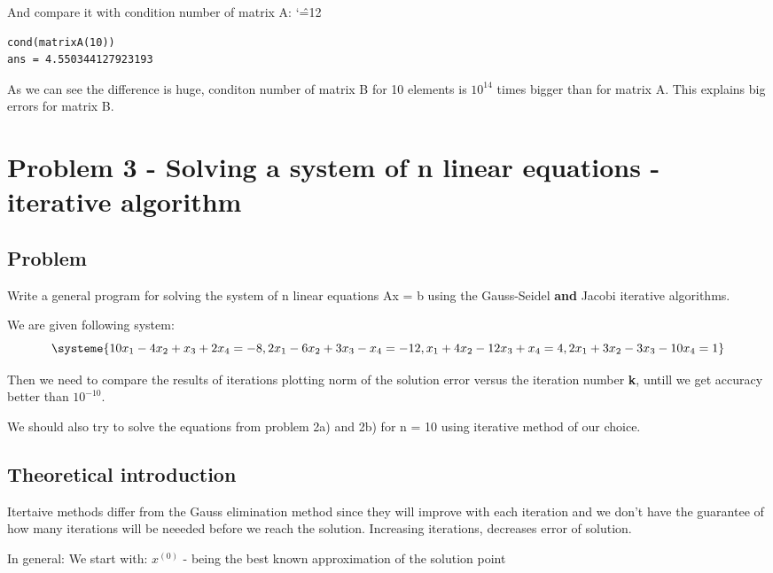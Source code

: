 \documentclass[12pt]{report}
\newenvironment{simplechar}{%
   \catcode`\^=12
}{}
\begin{document}
And compare it with condition number of matrix A:
\begin{simplechar}
\begin{lstlisting}
cond(matrixA(10))
ans = 4.550344127923193
\end{lstlisting}
\end{simplechar}
As we can see the difference is huge, conditon number of matrix B for 10 elements is $10^{14}$ times bigger than for matrix A. This explains big errors for matrix B.











\chapter{Problem 3 - Solving a system of n linear equations - iterative algorithm}

\section{Problem}
Write a general program for solving the system of n linear equations Ax = b using the Gauss-Seidel \textbf{and} Jacobi iterative algorithms.

We are given following system:
\[
\systeme{10x_1-4x_2+x_3+2x_4=-8, 2x_1-6x_2+3x_3-x_4=-12, x_1+4x_2-12x_3+x_4=4, 2x_1+3x_2-3x_3-10x_4=1}
\]

Then we need to compare the results of iterations plotting norm of the solution error versus the iteration number \textbf{k}, untill we get accuracy better than $10^{-10}$.

We should also try to solve the equations from problem 2a) and 2b) for n = 10 using iterative method of our choice.


\section{Theoretical introduction}

Itertaive methods differ from the Gauss elimination method since they will improve with each iteration and we don't have the guarantee of how many iterations will be neeeded before we reach the solution. Increasing iterations, decreases error of solution.

In general:
We start with:
 \textbf{$x^{(0)}$ } - being the best known approximation of the solution point
\end{document}
